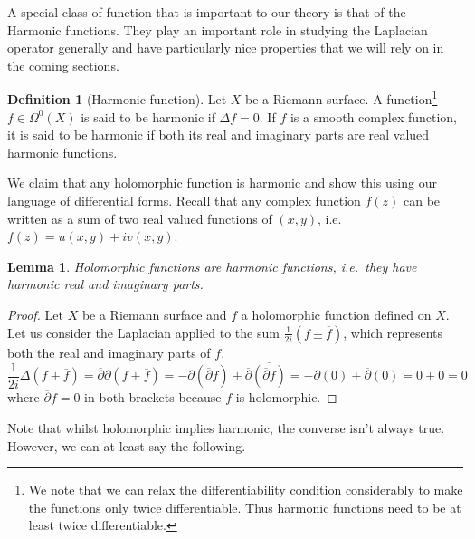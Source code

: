 \documentclass[11pt]{report}
\newtheorem{lemma}[thm]{Lemma}
\theoremstyle{definition}
\newtheorem{defn}[thm]{Definition}
\begin{document}
A special class of function that is important to our theory is that of the 
Harmonic functions. They play an important role in studying the Laplacian operator generally and have particularly nice properties that we will rely on in the coming sections.
\begin{defn}[Harmonic function]\label{HarmonicDef}
  Let $X$ be a Riemann surface. A function\footnote{We note that we can relax the differentiability condition considerably to make the functions only twice differentiable. Thus harmonic functions need to be at least twice differentiable.} $f\in \Omega^0(X)$ is said to be harmonic if $\Delta f = 0$. If $f$ is a smooth complex function, it is said to be harmonic if both its real and imaginary parts are real valued harmonic functions.
\end{defn}
We claim that any holomorphic function is harmonic and show this using our language of differential forms. Recall that any complex function $f(z)$ can be written as a sum of two real valued functions of $(x,y)$, i.e.\ $f(z)=u(x,y)+iv(x,y)$.
\begin{lemma}\label{HolIsHarm}
  Holomorphic functions are harmonic functions, i.e.\ they have harmonic real and imaginary parts. 
\end{lemma} 
\begin{proof}
  Let $X$ be a Riemann surface and $f$ a holomorphic function defined on $X$.
  Let us consider the Laplacian applied to the sum $\frac{1}{2i}(f \pm \overline{f})$, which represents both the real and imaginary parts of $f$.
  \[\frac{1}{2i}\Delta(f \pm \overline{f}) = \overline{\partial}\partial(f \pm \overline{f})=-\partial(\overline{\partial}f) \pm \overline{\partial}\overline{(\overline{\partial}f)}=-\partial(0) \pm \overline{\partial}(0) = 0 \pm 0 = 0\]
  where $\overline{\partial} f = 0$ in both brackets because $f$ is holomorphic.
\end{proof}

Note that whilst holomorphic implies harmonic, the converse isn't always true. However, we can at least say the following.
\end{document}
